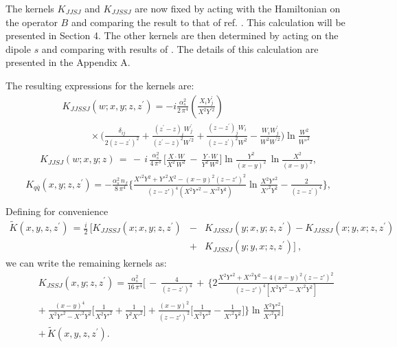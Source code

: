 \documentclass[11pt,a4paper]{article}
\begin{document}
 The kernels $K_{JJSJ}$ and $K_{JJSSJ}$  are now fixed by acting with the Hamiltonian on the operator $B$ and comparing the result to that of ref. \cite{Grab}.
 This calculation will be presented in Section 4. The other  kernels are then determined by acting on the dipole $s$  and
comparing with results of \cite{BC}. The details of this calculation  are presented in the  Appendix A.
 

The resulting expressions for the kernels are: 
\begin{eqnarray}
&&K_{JJSSJ}(w;x,y;z,z^\prime)=-i
\frac{\alpha_s^2}{ 2\,\pi^4}
\left(\frac{X_iY^\prime_j}{ X^2Y^{\prime 2}}
\right)
\nonumber \\
&&\ \ \ \ \ \  \ \ \ \ \ \ \ \times \Big(\frac{\delta_{ij}}{2 (z-z^\prime)^2}+\frac{(z^\prime-z)_i W^\prime_j}{ (z^\prime-z)^2 W^{\prime 2}}+
\frac{(z-z^\prime)_j W_i}{ (z-z^\prime)^2 W^{ 2}}-\frac{W_i W^\prime_j}{ W^2 W^{\prime 2}}
\Big)\ln\frac{W^2}{ {W'}^2}
\end{eqnarray}
\begin{eqnarray}\label{KJJSJ}
K_{JJSJ}(w;x,y;z)\,=\,-\,i\,\frac{\alpha_s^2}{ 4\, \pi^3 }\,\Big[ \frac{X\cdot W}{ X^2\,W^2}\,-\, \frac{Y\cdot W}{ Y^2\,W^2}    \Big] \ln\frac{Y^2}{ (x-y)^2}\,\ln\frac{X^2}{ (x-y)^2},
\end{eqnarray}
\begin{eqnarray}\label{Kqq}
K_{q\bar q}(x,y;z,z^\prime) =-\frac{\alpha_s^2\,n_f}{ 8\,\pi^4}
\Big\{
\frac{{X'}^2Y^2+{Y'}^2X^2-(x-y)^2(z-z')^2}{ (z-z')^4(X^2{Y'}^2-{X'}^2Y^2)}
\ln\frac{X^2{Y'}^2}{ {X'}^2Y^2}-\frac{2}{(z-z^\prime)^4}\Big\},\nonumber \\
\end{eqnarray}
Defining for convenience
\begin{eqnarray}
\tilde K(x,y,z,z^\prime)\,=\frac{i}{2}\,\Big[K_{JJSSJ}(x;x,y;z,z^\prime)&-&K_{JJSSJ}(y;x,y;z,z^\prime)-K_{JJSSJ}(x;y,x;z,z^\prime)\nonumber \\
&+&K_{JJSSJ}(y;y,x;z,z^\prime)\Big]\ ,
\end{eqnarray}
we can write the remaining kernels as:
\begin{eqnarray}\label{KJSSJ}
&&K_{JSSJ}(x,y;z,z^\prime) = \frac{\alpha_s^2}{16\,\pi^4}
\Bigg[\,-\,\frac{4}{ (z-z^\prime)^4}\,+\,
\Big\{2\frac{X^2{Y'}^2+{X'}^2Y^2-4(x-y)^2(z-z')^2}{ (z-z')^4[X^2{Y'}^2-{X'}^2Y^2]}\nonumber\\ 
&&+
~\frac{(x-y)^4}{ X^2{Y'}^2-{X'}^2Y^2}\Big[
\frac{1}{X^2{Y'}^2}+\frac{1}{ Y^2{X'}^2}\Big]
+\frac{(x-y)^2}{(z-z')^2}\Big[\frac{1}{X^2{Y'}^2}-\frac{1}{ {X'}^2Y^2}\Big]\Big\}
\ln\frac{X^2{Y'}^2}{ {X'}^2Y^2}\Bigg]\nonumber \\ 
&&+\,\tilde K(x,y,z,z^\prime)\label{tildeK}.
\end{eqnarray}
\end{document}
